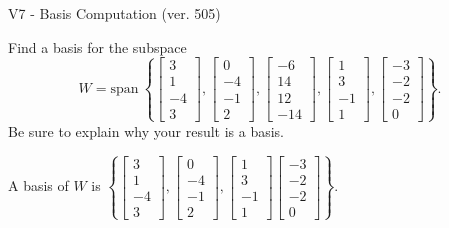 \begin{exercise}
  \begin{exerciseTitle}V7 - Basis Computation (ver. 505)\end{exerciseTitle}
  \begin{exerciseStatement}
    Find a basis for the subspace 
\[W=\mathrm{span}\ \left\{\left[\begin{array}{r}
3 \\
1 \\
-4 \\
3
\end{array}\right] , \left[\begin{array}{r}
0 \\
-4 \\
-1 \\
2
\end{array}\right] , \left[\begin{array}{r}
-6 \\
14 \\
12 \\
-14
\end{array}\right] , \left[\begin{array}{r}
1 \\
3 \\
-1 \\
1
\end{array}\right] , \left[\begin{array}{r}
-3 \\
-2 \\
-2 \\
0
\end{array}\right]\right\}.\]
 Be sure to explain why your result is a basis.


  \end{exerciseStatement}
  \begin{exerciseAnswer}
   A basis of \(W\) is  \(\left\{\left[\begin{array}{r}
3 \\
1 \\
-4 \\
3
\end{array}\right] , \left[\begin{array}{r}
0 \\
-4 \\
-1 \\
2
\end{array}\right] , \left[\begin{array}{r}
1 \\
3 \\
-1 \\
1
\end{array}\right] \left[\begin{array}{r}
-3 \\
-2 \\
-2 \\
0
\end{array}\right]\right\}\).
  


  \end{exerciseAnswer}
\end{exercise}